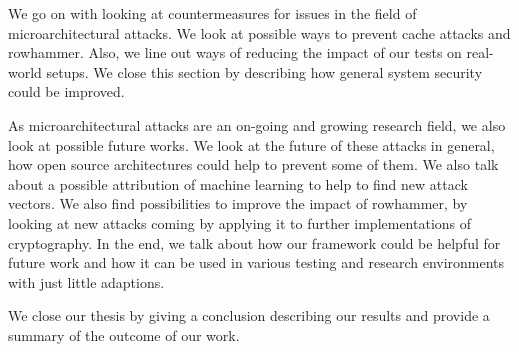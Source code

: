 We go on with looking at countermeasures for issues in the field of
microarchitectural attacks. We look at possible ways to prevent cache attacks
and rowhammer. Also, we line out ways of reducing the impact of our tests on
real-world setups. We close this section by describing how general system
security could be improved.

As microarchitectural attacks are an on-going and growing research field, we
also look at possible future works. We look at the future of these attacks in
general, how open source architectures could help to prevent some of them. We
also talk about a possible attribution of machine learning to help to find new
attack vectors. We also find possibilities to improve the impact of rowhammer,
by looking at new attacks coming by applying it to further implementations of
cryptography. In the end, we talk about how our framework could be helpful for
future work and how it can be used in various testing and research environments
with just little adaptions.

We close our thesis by giving a conclusion describing our results and provide a
summary of the outcome of our work.

